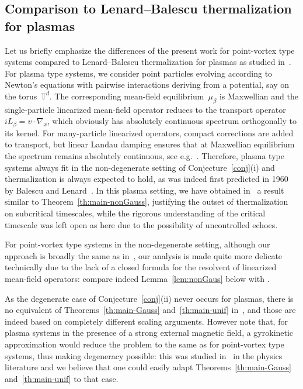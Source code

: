 \documentclass[a4paper,11pt,reqno,noindent]{amsart}
\theoremstyle{plain}
\numberwithin{equation}{section}
\newcommand{\T}{\mathbb T}
\newcommand{\3}{|\!|\!|}
\begin{document}
{\subsection{Comparison to Lenard--Balescu thermalization for plasmas}
Let us briefly emphasize the differences of the present work for point-vortex type systems compared to Lenard--Balescu thermalization for plasmas as studied in~\cite{DSR-21}. For plasma type systems, we consider point particles evolving according to Newton's equations with pairwise interactions deriving from a potential, say on the torus~$\T^d$. The corresponding mean-field equilibrium~$\mu_\beta$ is Maxwellian and the single-particle linearized mean-field operator reduces to the transport operator $iL_\beta=v\cdot\nabla_x$, which obviously has absolutely continuous spectrum orthogonally to its kernel. For many-particle linearized operators, compact corrections are added to transport, but linear Landau damping ensures that at Maxwellian equilibrium the spectrum remains absolutely continuous, see e.g.~\cite[Lemma~4.2]{DSR-21}. Therefore, plasma type systems always fit in the non-degenerate setting of Conjecture~\ref{conj}(i) and thermalization is always expected to hold, as was indeed first predicted in 1960 by Balescu and Lenard~\cite{Balescu-60,Lenard-60,Guernsey-62,TGM-64}.
In this plasma setting, we have obtained in~\cite{DSR-21} a result similar to Theorem~\ref{th:main-nonGauss}, justifying the outset of thermalization on subcritical timescales, while the rigorous understanding of the critical timescale was left open as here due to the possibility of uncontrolled echoes.

For point-vortex type systems in the non-degenerate setting, although our approach is broadly the same as in~\cite{DSR-21}, our analysis is made quite more delicate technically due to the lack of a closed formula for the resolvent of linearized mean-field operators: compare indeed Lemma~\ref{lem:nonGaus} below with \cite[Lemma~4.2]{DSR-21}.

As the degenerate case of Conjecture~\ref{conj}(ii) never occurs for plasmas, there is no equivalent of Theorems~\ref{th:main-Gauss} and~\ref{th:main-unif} in~\cite{DSR-21}, and those are indeed based on completely different scaling arguments. However note that, for plasma systems in the presence of a strong external magnetic field, a gyrokinetic approximation would reduce the problem to the same as for point-vortex type systems, thus making degeneracy possible: this was studied in~\cite{Taylor-McNamara-71} in the physics literature and we believe that one could easily adapt Theorems~\ref{th:main-Gauss} and~\ref{th:main-unif} to that case.
}
\end{document}
